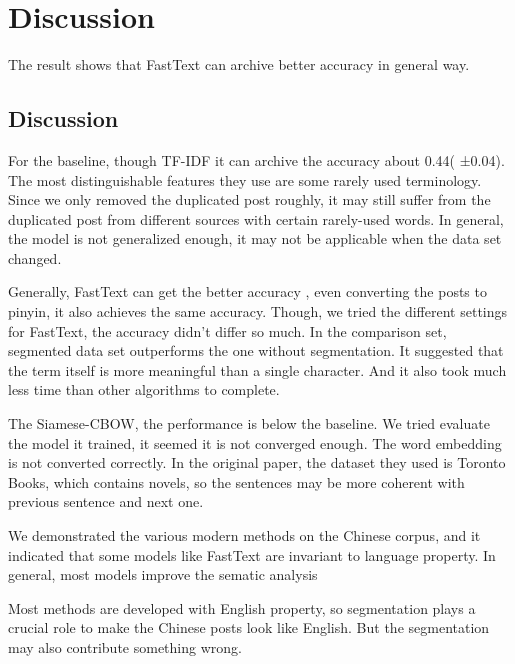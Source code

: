 \chapter{Discussion}

The result shows that FastText can archive better accuracy in general way.

\section{Discussion}


For the baseline, though TF-IDF it can archive the accuracy about 0.44( ±0.04). The most distinguishable features they use are some rarely used terminology. Since we only removed the duplicated post roughly, it may still suffer from the duplicated post from different sources with certain rarely-used words. In general, the model is not generalized enough, it may not be applicable when the data set changed.

Generally, FastText can get the better accuracy , even converting the posts to pinyin, it also achieves the same accuracy. Though, we tried the different settings for FastText, the accuracy didn't differ so much. In the comparison set, segmented data set outperforms the one without segmentation. It suggested that the term itself is more meaningful than a single character. And it also took much less time than other algorithms to complete.

The Siamese-CBOW, the performance is below the baseline. We tried evaluate the model it trained, it seemed it is not converged enough. The word embedding is not converted correctly. In the original paper, the dataset they used is Toronto Books, which contains novels, so the sentences may be more coherent with previous sentence and next one.


We demonstrated the various modern methods on the Chinese corpus, and it indicated that some models like FastText are invariant to language property. In general, most models improve the sematic analysis

Most methods are developed with English property, so segmentation plays a crucial role to make the Chinese posts look like English. But the segmentation may also contribute something wrong. 